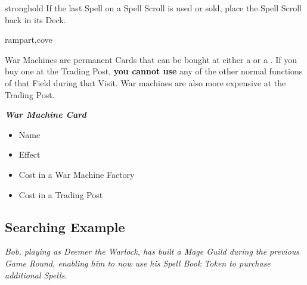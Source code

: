 \begin{multicols*}{2}
\begin{expansion}{stronghold}
If the last Spell on a Spell Scroll is used or sold, place the Spell Scroll back in its Deck.
\end{expansion}
\vspace*{1em}
\begin{expansion}{rampart,cove}

  War Machines are permanent Cards that can be bought at either a  or a .
  If you buy one at the Trading Post, \textbf{you cannot use} any of the other normal functions of that Field during that Visit.
  War machines are also more expensive at the Trading Post.

  {
    \bigskip
    \centering
    \begin{scriptsize}
    \end{scriptsize}

    \footnotesize
    \textbf{\textit{\textcolor{darkcandyapplered}{War Machine Card}}}
    \begin{itemize}[itemsep=0pt, parsep=5pt, topsep=0pt, partopsep=0pt]
      \item[\textbf{1.}] Name
      \item[\textbf{2.}] Effect
      \item[\textbf{3.}] Cost in a War Machine Factory
      \item[\textbf{4.}] Cost in a Trading Post
    \end{itemize}
  }
\end{expansion}

\vspace*{\fill}

\subsection*{Searching Example}

\textit{Bob, playing as Deemer the Warlock, has built a Mage Guild during the previous Game Round, enabling him to now use his Spell Book Token to purchase additional Spells.}


\end{multicols*}
